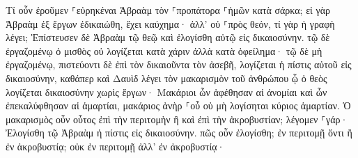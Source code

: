 \documentclass{openreader}
\begin{document}
Τί οὖν ἐροῦμεν ⸀εὑρηκέναι Ἀβραὰμ τὸν ⸀προπάτορα ⸀ἡμῶν κατὰ σάρκα; 
εἰ γὰρ Ἀβραὰμ ἐξ ἔργων ἐδικαιώθη, ἔχει καύχημα· ἀλλ’ οὐ ⸀πρὸς θεόν, 
τί γὰρ ἡ γραφὴ λέγει; Ἐπίστευσεν δὲ Ἀβραὰμ τῷ θεῷ καὶ ἐλογίσθη αὐτῷ εἰς δικαιοσύνην. 
τῷ δὲ ἐργαζομένῳ ὁ μισθὸς οὐ λογίζεται κατὰ χάριν ἀλλὰ κατὰ ὀφείλημα· 
τῷ δὲ μὴ ἐργαζομένῳ, πιστεύοντι δὲ ἐπὶ τὸν δικαιοῦντα τὸν ἀσεβῆ, λογίζεται ἡ πίστις αὐτοῦ εἰς δικαιοσύνην, 
καθάπερ καὶ Δαυὶδ λέγει τὸν μακαρισμὸν τοῦ ἀνθρώπου ᾧ ὁ θεὸς λογίζεται δικαιοσύνην χωρὶς ἔργων· 
Μακάριοι ὧν ἀφέθησαν αἱ ἀνομίαι καὶ ὧν ἐπεκαλύφθησαν αἱ ἁμαρτίαι, 
μακάριος ἀνὴρ ⸀οὗ οὐ μὴ λογίσηται κύριος ἁμαρτίαν. 
Ὁ μακαρισμὸς οὖν οὗτος ἐπὶ τὴν περιτομὴν ἢ καὶ ἐπὶ τὴν ἀκροβυστίαν; λέγομεν ⸀γάρ· Ἐλογίσθη τῷ Ἀβραὰμ ἡ πίστις εἰς δικαιοσύνην. 
πῶς οὖν ἐλογίσθη; ἐν περιτομῇ ὄντι ἢ ἐν ἀκροβυστίᾳ; οὐκ ἐν περιτομῇ ἀλλ’ ἐν ἀκροβυστίᾳ· 
\end{document}

